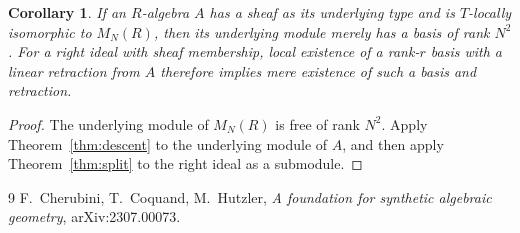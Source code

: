 \documentclass[11pt]{amsart}
\newtheorem{corollary}[theorem]{Corollary}
\theoremstyle{definition}
\begin{document}
\begin{corollary}
If an $R$-algebra $A$ has a sheaf as its underlying type and is
$T$-locally isomorphic to $M_N(R)$, then its underlying module merely
has a basis of rank $N^2$. For a right ideal with sheaf membership,
local existence of a rank-$r$ basis with a linear retraction from $A$
therefore implies mere existence of such a basis and retraction.
\end{corollary}
\begin{proof}
The underlying module of $M_N(R)$ is free of rank $N^2$. Apply
Theorem~\ref{thm:descent} to the underlying module of $A$, and then apply
Theorem~\ref{thm:split} to the right ideal as a submodule.
\end{proof}

\begin{thebibliography}{9}
 F.~Cherubini, T.~Coquand, M.~Hutzler,
\emph{A foundation for synthetic algebraic geometry},
arXiv:2307.00073.
\end{thebibliography}
\end{document}
